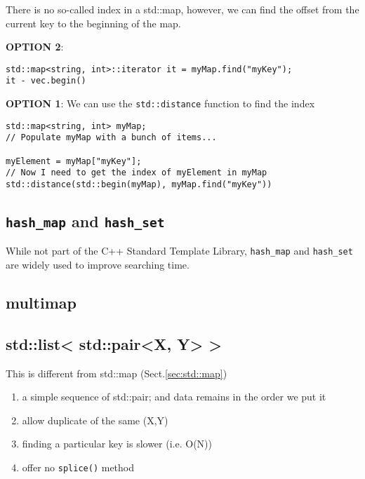 There is no so-called index in a std::map, however, we can find the offset from
the current key to the beginning of the map. 

{\bf OPTION 2}: 
\begin{verbatim}
std::map<string, int>::iterator it = myMap.find("myKey");
it - vec.begin()
\end{verbatim}


{\bf OPTION 1}: We can use the \verb!std::distance! 
function to find the index

\begin{verbatim}
std::map<string, int> myMap;
// Populate myMap with a bunch of items...

myElement = myMap["myKey"];
// Now I need to get the index of myElement in myMap
std::distance(std::begin(myMap), myMap.find("myKey"))
\end{verbatim}


\cprotect\subsection{\verb!hash_map! and \verb!hash_set!}
\label{sec:hash_map}
\label{sec:hash_set}

While not part of the C++ Standard Template Library, 
\verb!hash_map! and
\verb!hash_set! are widely used to improve searching time.


\subsection{multimap}
\label{sec:multimap}



\subsection{std::list< std::pair<X, Y> >}
\label{sec:list_pairs}

This is different from std::map (Sect.\ref{sec:std::map})
\begin{enumerate}
  \item a simple sequence of std::pair; and data remains in the order we put it
  
  \item allow duplicate of the same (X,Y)
  
  \item finding a particular key is slower (i.e. O(N)) 
  
  \item offer no \verb!splice()! method
\end{enumerate}




